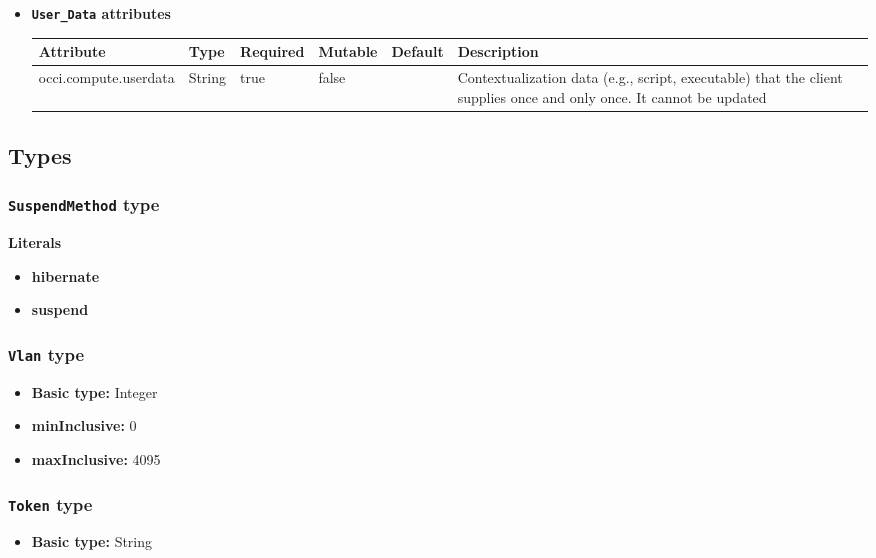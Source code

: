 \begin{itemize}
\item \textbf{\texttt{User\_Data} attributes}

\begin{tabularx}{\textwidth}{|l|l|p{1.4cm}|p{1.3cm}|l|X|}
  \hline
  \textbf{Attribute} & \textbf{Type} & \textbf{Required} & \textbf{Mutable} & \textbf{Default} & \textbf{Description} \\
  \hline  
  occi.compute.userdata & String & true & false &  & Contextualization data (e.g., script, executable) that the client supplies once and only once. It cannot be updated \\
  \hline
\end{tabularx}
\end{itemize}


\subsection{Types}
\subsubsection{\texttt{SuspendMethod} type}

\textbf{Literals}
\begin{itemize}
\item \textbf{hibernate} 
\end{itemize}
\begin{itemize}
\item \textbf{suspend} 
\end{itemize}

\subsubsection{\texttt{Vlan} type}

\begin{itemize}
\item \textbf{Basic type:} Integer
	\item \textbf{minInclusive:} 0
	\item \textbf{maxInclusive:} 4095
\end{itemize}
\subsubsection{\texttt{Token} type}

\begin{itemize}
\item \textbf{Basic type:} String
\end{itemize}
